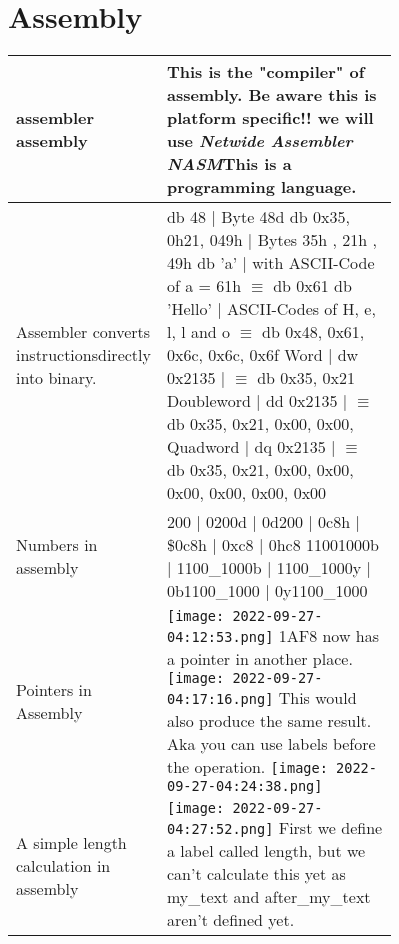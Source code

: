 \documentclass[main.tex,fontsize=8pt,paper=a4,paper=portrait,DIV=calc,]{scrartcl}
\begin{document}
\pagebreak
\begin{table}[h!]
\section{Assembly}
\begin{tabular}{|m{0,2\linewidth}|m{0.755\linewidth}|}
\hline
assembler \newline 
assembly & This is the "compiler" of assembly. Be aware this is \textbf{platform specific!!} we will use \emph{Netwide Assembler NASM}\newline This is a programming language.\\
\hline
Assembler converts instructions\newline directly into binary. & db 48 | Byte 48d \newline
db 0x35, 0h21, 049h | Bytes 35h , 21h , 49h \newline
db ’a’ | with ASCII-Code of a = 61h \(\equiv\) db 0x61 \newline
db ’Hello’ | ASCII-Codes of H, e, l, l and o \(\equiv\) db 0x48, 0x61, 0x6c, 0x6c, 0x6f\newline
Word       | dw 0x2135 | \(\equiv\) db 0x35, 0x21\newline
Doubleword | dd 0x2135 | \(\equiv\) db 0x35, 0x21, 0x00, 0x00, \newline 
Quadword   | dq 0x2135 | \(\equiv\) db 0x35, 0x21, 0x00, 0x00, 0x00, 0x00, 0x00, 0x00 \\
\hline
Numbers in assembly & 200 | 0200d | 0d200 | 0c8h | \$0c8h | 0xc8 | 0hc8 \newline
11001000b | 1100\_1000b | 1100\_1000y | 0b1100\_1000 | 0y1100\_1000
\\
\hline
Pointers in Assembly & \vspace{2mm}\texttt{[image: 2022-09-27-04:12:53.png]} \newline
1AF8 now has a pointer in another place. \newline
\texttt{[image: 2022-09-27-04:17:16.png]}\newline
This would also produce the same result. Aka you can use labels before the operation.\newline
\texttt{[image: 2022-09-27-04:24:38.png]}\\
\hline
A simple length calculation in assembly & \vspace{2mm} \texttt{[image: 2022-09-27-04:27:52.png]}\newline 
First we define a label called length, but we can't calculate this yet as my\_text and after\_my\_text aren't defined yet.\newline

\end{tabular}
\end{table}
\end{document}
